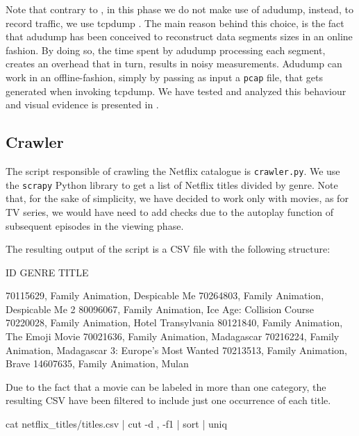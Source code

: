 Note that contrary to \cite{netflix-real-time}, in this phase we do not make
use of adudump, instead, to record traffic, we use tcpdump \cite{libpcap}. The
main reason behind this choice, is the fact that adudump has been conceived to
reconstruct data segments sizes in an online fashion. By doing so, the time
spent by adudump processing each segment, creates an overhead that in turn,
results in noisy measurements.  Adudump can work in an offline-fashion, simply
by passing as input a \texttt{pcap} \cite{libpcap} file, that gets generated
when invoking tcpdump.  We have tested and analyzed this behaviour and visual
evidence is presented in .


\subsection{Crawler}

The script responsible of crawling the Netflix catalogue is
\texttt{crawler.py}.  We use the \texttt{scrapy} Python library \cite{scrapy}
to get a list of Netflix titles divided by genre. Note that, for the sake of
simplicity, we have decided to work only with movies, as for TV series, we
would have need to add checks due to the autoplay function of subsequent
episodes in the viewing phase.

The resulting output of the script is a CSV file with the following structure:

\begin{adu}[caption={Sample of crawled movies}, label={lst:crawl_output}]
ID        GENRE             TITLE

70115629, Family Animation, Despicable Me
70264803, Family Animation, Despicable Me 2
80096067, Family Animation, Ice Age: Collision Course
70220028, Family Animation, Hotel Transylvania
80121840, Family Animation, The Emoji Movie
70021636, Family Animation, Madagascar
70216224, Family Animation, Madagascar 3: Europe's Most Wanted
70213513, Family Animation, Brave
14607635, Family Animation, Mulan
\end{adu}

Due to the fact that a movie can be labeled in more than one category, the
resulting CSV have been filtered to include just one occurrence of each title.

\begin{bash_script}[caption={Command to filter out unique IDs}, label={titles}]
cat netflix_titles/titles.csv | cut -d , -f1 | sort | uniq
\end{bash_script}

